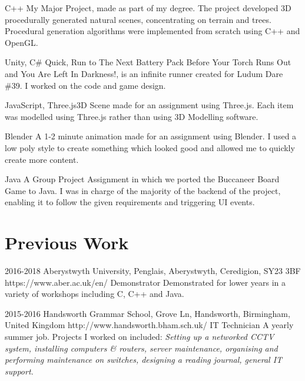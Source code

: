 \documentclass[10pt]{article} %
\begin{document}
 {C++} {My Major Project, made as part of my degree. The project developed 3D procedurally generated natural scenes, concentrating on terrain and trees. Procedural generation algorithms were implemented from scratch using C++ and OpenGL.}

 {Unity, C\#} 
{Quick, Run to The Next Battery Pack Before Your Torch Runs Out and You Are Left In Darkness!, is an infinite runner created for Ludum Dare \#39. I worked on the code and game design.} 

 {JavaScript, Three.js}{3D Scene made for an assignment using Three.js. Each item was modelled using Three.js rather than using 3D Modelling software.}

 {Blender}
{A 1-2 minute animation made for an assignment using Blender. I used a low poly style to create something which looked good and allowed me to quickly create more content.}

 {Java} {A Group Project Assignment in which we ported the Buccaneer Board Game to Java. I was in charge of the majority of the backend of the project, enabling it to follow the given requirements and triggering UI events.}



 

\section{Previous Work}

\job
{2016-}{2018}
{Aberystwyth University, Penglais, Aberystwyth, Ceredigion, SY23 3BF}
{https://www.aber.ac.uk/en/}
{Demonstrator}
{Demonstrated for lower years in a variety of workshops including C, C++ and Java.} 

\job
{2015-}{2016}
{Handsworth Grammar School, Grove Ln, Handsworth, Birmingham, United Kingdom}
{http://www.handsworth.bham.sch.uk/}
{IT Technician}
{A yearly summer job. Projects I worked on included: \textit{Setting up a networked CCTV system, installing computers \& routers, server maintenance, organising and performing maintenance on switches, designing a reading journal, general IT support.}}
\end{document}
